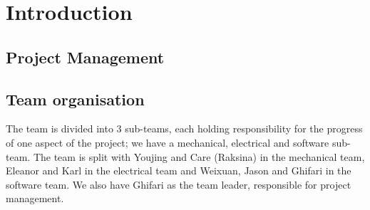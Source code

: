 









\maketitle

\section{Introduction}
\subsection{Project Management}
\subsection{Team organisation}

The team is divided into 3 sub-teams, each holding responsibility for the progress of one aspect of the project; we have a mechanical, electrical and software sub-team. The team is split with Youjing and Care (Raksina) in the mechanical team, Eleanor and Karl in the electrical team and Weixuan, Jason and Ghifari in the software team. We also have Ghifari as the team leader, responsible for project management.


